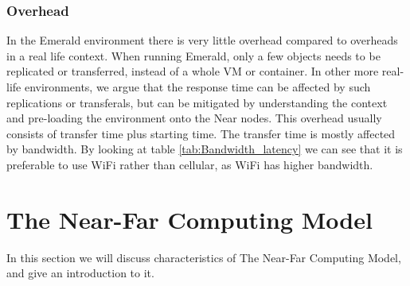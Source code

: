 \subsubsection{Overhead}
In the Emerald environment there is very little overhead compared to overheads in a real life context. When running Emerald, only a few objects needs to be replicated or transferred, instead of a whole VM or container. In other more real-life environments, we argue that the response time can be affected by such replications or transferals, but can be mitigated by understanding the context and pre-loading the environment onto the Near nodes. This overhead usually consists of transfer time plus starting time. The transfer time is mostly affected by bandwidth. By looking at table \ref{tab:Bandwidth_latency} we can see that it is preferable to use WiFi rather than cellular, as WiFi has higher bandwidth.








\section{The Near-Far Computing Model}
In this section we will discuss characteristics of The Near-Far Computing Model, and give an introduction to it. 




